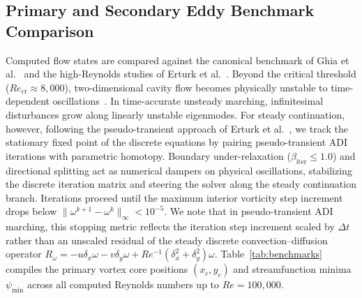 \documentclass[11pt,a4paper]{article}
\begin{document}
\subsection{Primary and Secondary Eddy Benchmark Comparison}
Computed flow states are compared against the canonical benchmark of Ghia et al.~\cite{ghia1982high} and the high-Reynolds studies of Erturk et al.~\cite{erturk2005numerical,erturk2009discussions}. Beyond the critical threshold ($Re_{\text{cr}} \approx 8{,}000$), two-dimensional cavity flow becomes physically unstable to time-dependent oscillations~\cite{shen1991hopf,peng2003transition,bruneau20062d}. In time-accurate unsteady marching, infinitesimal disturbances grow along linearly unstable eigenmodes. For steady continuation, however, following the pseudo-transient approach of Erturk et al.~\cite{erturk2005numerical,erturk2009discussions}, we track the stationary fixed point of the discrete equations by pairing pseudo-transient ADI iterations with parametric homotopy. Boundary under-relaxation ($\beta_{\text{iter}} \le 1.0$) and directional splitting act as numerical dampers on physical oscillations, stabilizing the discrete iteration matrix and steering the solver along the steady continuation branch. Iterations proceed until the maximum interior vorticity step increment drops below $\|\omega^{k+1} - \omega^k\|_\infty < 10^{-5}$. We note that in pseudo-transient ADI marching, this stopping metric reflects the iteration step increment scaled by $\Delta t$ rather than an unscaled residual of the steady discrete convection--diffusion operator $R_\omega = -u \delta_x \omega - v \delta_y \omega + Re^{-1}(\delta_x^2 + \delta_y^2)\omega$. Table~\ref{tab:benchmarks} compiles the primary vortex core positions $(x_c, y_c)$ and streamfunction minima $\psi_{\min}$ across all computed Reynolds numbers up to $Re = 100{,}000$.
\end{document}
